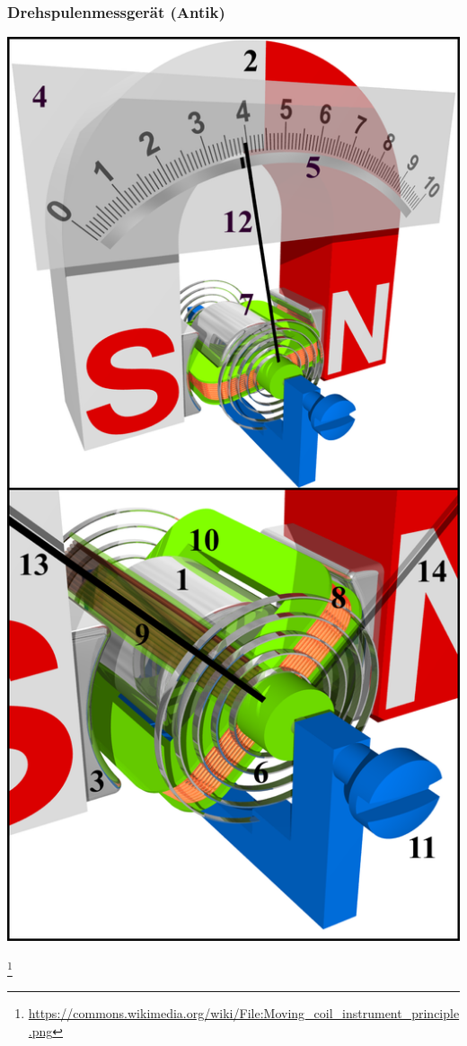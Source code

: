 \begin{frame}
    \frametitle{Drehspulenmessgerät (Antik)}
	\begin{minipage}{0.4\textwidth}
	    \includegraphics[width=.95\textwidth]{e17/drehspulenMess.png}\\
	\end{minipage}
	        \footnote{\tiny \url{https://commons.wikimedia.org/wiki/File:Moving_coil_instrument_principle.png}}

\end{frame}
